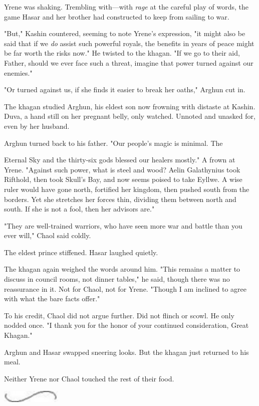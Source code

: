 Yrene was shaking. Trembling with---with \emph{rage} at the careful play of words, the game Hasar and her brother had constructed to keep from sailing to war.

"But," Kashin countered, seeming to note Yrene's expression, "it might also be said that if we \emph{do} assist such powerful royals, the benefits in years of peace might be far worth the risks now." He twisted to the khagan. "If we go to their aid, Father, should we ever face such a threat, imagine that power turned against our enemies."

"Or turned against us, if she finds it easier to break her oaths," Arghun cut in.

The khagan studied Arghun, his eldest son now frowning with distaste at Kashin. Duva, a hand still on her pregnant belly, only watched. Unnoted and unasked for, even by her husband.

Arghun turned back to his father. "Our people's magic is minimal. The

Eternal Sky and the thirty-six gods blessed our healers mostly." A frown at Yrene. "Against such power, what is steel and wood? Aelin Galathynius took Rifthold, then took Skull's Bay, and now seems poised to take Eyllwe. A wise ruler would have gone north, fortified her kingdom, then pushed south from the borders. Yet she stretches her forces thin, dividing them between north and south. If she is not a fool, then her advisors are."

"They are well-trained warriors, who have seen more war and battle than you ever will," Chaol said coldly.

The eldest prince stiffened. Hasar laughed quietly.

The khagan again weighed the words around him. "This remains a matter to discuss in council rooms, not dinner tables," he said, though there was no reassurance in it. Not for Chaol, not for Yrene. "Though I am inclined to agree with what the bare facts offer."

To his credit, Chaol did not argue further. Did not flinch or scowl. He only nodded once. "I thank you for the honor of your continued consideration, Great Khagan."

Arghun and Hasar swapped sneering looks. But the khagan just returned to his meal.

Neither Yrene nor Chaol touched the rest of their food.

\includegraphics[width=1.12in,height=0.24in]{images/seperator}

